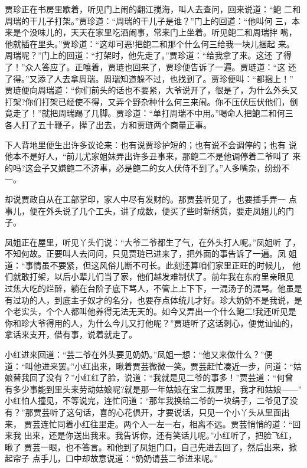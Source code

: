 贾珍正在书房里歇着，听见门上闹的翻江搅海，叫人去查问，回来说道：“鲍
二和周瑞的干儿子打架。”贾珍道：“周瑞的干儿子是谁？”门上的回道：“他叫何
三，本来是个没味儿的，天天在家里吃酒闹事，常来门上坐着。听见鲍二和周瑞拌
嘴，他就插在里头。”贾珍道：“这却可恶!把鲍二和那个什么何三给我一块儿捆起
来。周瑞呢？”门上的回道：“打架时，他先走了。”贾珍道：“给我拿了来。这还
了得了！”众人答应了。正嚷着，贾琏也回来了，贾珍便告诉了一遍。贾琏道：“这
还了得。”又添了人去拿周瑞。周瑞知道躲不过，也找到了。贾珍便叫：“都捆上！”
贾琏便向周瑞道：“你们前头的话也不要紧，大爷说开了，很是了，为什么外头又
打架?你们打架已经使不得，又弄个野杂种什么何三来闹。你不压伏压伏他们，倒
竟走了！”就把周瑞踢了几脚。贾珍道：“单打周瑞不中用。”喝命人把鲍二和何三
各人打了五十鞭子，撵了出去，方和贾琏两个商量正事。

下人背地里便生出许多议论来：也有说贾珍护短的；也有说不会调停的；也有
说他本不是好人，“前儿尤家姐妹弄出许多丑事来，那鲍二不是他调停着二爷叫了
来的吗?这会子又嫌鲍二不济事，必是鲍二的女人伏侍不到了。”人多嘴杂，纷纷不
一。

却说贾政自从在工部掌印，家人中尽有发财的。那贾芸听见了，也要插手弄一
点事儿，便在外头说了几个工头，讲了成数，便买了些时新绣货，要走凤姐儿的门
子。

凤姐正在屋里，听见丫头们说：“大爷二爷都生了气，在外头打人呢。”凤姐听
了，不知何故。正要叫人去问问，只见贾琏已进来了，把外面的事告诉了一遍。凤
姐道：“事情虽不要紧，但这风俗儿断不可长。此刻还算咱们家里正旺的时候儿，
他们就敢打架，以后小辈儿们当了家，他们越发难制伏了。前年我在东府里亲眼见
过焦大吃的烂醉，躺在台阶子底下骂人，不管上上下下，一混汤子的混骂。他虽是
有过功的人，到底主子奴才的名分，也要存点体统儿才好。珍大奶奶不是我说，是
个老实头，个个人都叫他养得无法无天的。如今又弄出一个什么鲍二!我还听见是
你和珍大爷得用的人，为什么今儿又打他呢？”贾琏听了这话刺心，便觉讪讪的，
拿话来支开，借有事，说着就走了。

小红进来回道：“芸二爷在外头要见奶奶。”凤姐一想：“他又来做什么？”便
道：“叫他进来罢。”小红出来，瞅着贾芸微微一笑。贾芸赶忙凑近一步，问道：“姑
娘替我回了没有？”小红红了脸，说道：“我就是见二爷的事多！”贾芸道：“何曾
有多少事能到里头来劳动姑娘呢?就是那一年姑娘在宝二叔房里，我才和姑娘——”
小红怕人撞见，不等说完，连忙问道：“那年我换给二爷的一块绢子，二爷见了没
有？”那贾芸听了这句话，喜的心花俱开，才要说话，只见一个小丫头从里面出来，
贾芸连忙同着小红往里走。两个人一左一右，相离不远。贾芸悄悄的道：“回来我
出来，还是你送出我来。我告诉你，还有笑话儿呢。”小红听了，把脸飞红，瞅了
贾芸一眼，也不答言。和他到了凤姐门口，自己先进去回了，然后出来，掀起帘子
点手儿，口中却故意说道：“奶奶请芸二爷进来呢。”

